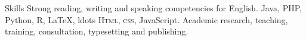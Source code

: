 
\begin{rubric}{Skills}
\entry*[Languages]
	Strong reading, writing and speaking competencies for English.
	Java, PHP, Python, R,  LaTeX, ldots
	\textsc{Html, css}, JavaScript.
\entry*[Misc.]
	Academic research, teaching, training, consultation,  typesetting and publishing.
\end{rubric}
